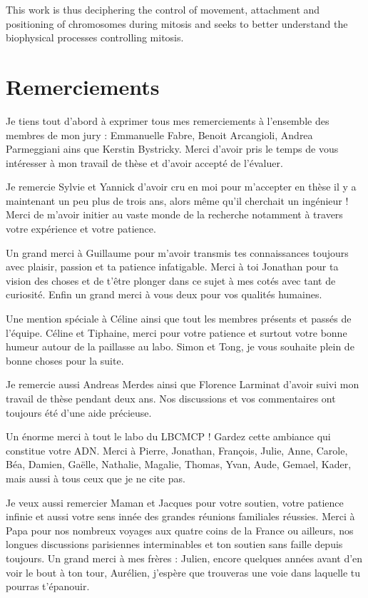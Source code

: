 \documentclass[12pt,a4paper,twoside,openright]{book}
\begin{document}
This work is thus deciphering the control of movement, attachment and
positioning of chromosomes during mitosis and seeks to better understand
the biophysical processes controlling mitosis.

\cleardoublepage

\section*{Remerciements}

Je tiens tout d'abord à exprimer tous mes remerciements à l'ensemble des
membres de mon jury : Emmanuelle Fabre, Benoit Arcangioli, Andrea
Parmeggiani ains que Kerstin Bystricky. Merci d'avoir pris le temps de
vous intéresser à mon travail de thèse et d'avoir accepté de l'évaluer.

Je remercie Sylvie et Yannick d'avoir cru en moi pour m'accepter en
thèse il y a maintenant un peu plus de trois ans, alors même qu'il
cherchait un ingénieur ! Merci de m'avoir initier au vaste monde de la
recherche notamment à travers votre expérience et votre patience.

Un grand merci à Guillaume pour m'avoir transmis tes connaissances
toujours avec plaisir, passion et ta patience infatigable. Merci à toi
Jonathan pour ta vision des choses et de t'être plonger dans ce sujet à
mes cotés avec tant de curiosité. Enfin un grand merci à vous deux pour
vos qualités humaines.

Une mention spéciale à Céline ainsi que tout les membres présents et
passés de l'équipe. Céline et Tiphaine, merci pour votre patience et
surtout votre bonne humeur autour de la paillasse au labo. Simon et
Tong, je vous souhaite plein de bonne choses pour la suite.

Je remercie aussi Andreas Merdes ainsi que Florence Larminat d'avoir
suivi mon travail de thèse pendant deux ans. Nos discussions et vos
commentaires ont toujours été d'une aide précieuse.

Un énorme merci à tout le labo du LBCMCP ! Gardez cette ambiance qui
constitue votre ADN. Merci à Pierre, Jonathan, François, Julie, Anne,
Carole, Béa, Damien, Gaëlle, Nathalie, Magalie, Thomas, Yvan, Aude,
Gemael, Kader, mais aussi à tous ceux que je ne cite pas.

Je veux aussi remercier Maman et Jacques pour votre soutien, votre
patience infinie et aussi votre sens innée des grandes réunions
familiales réussies. Merci à Papa pour nos nombreux voyages aux quatre
coins de la France ou ailleurs, nos longues discussions parisiennes
interminables et ton soutien sans faille depuis toujours. Un grand merci
à mes frères : Julien, encore quelques années avant d'en voir le bout à
ton tour, Aurélien, j'espère que trouveras une voie dans laquelle tu
pourras t'épanouir.
\end{document}
